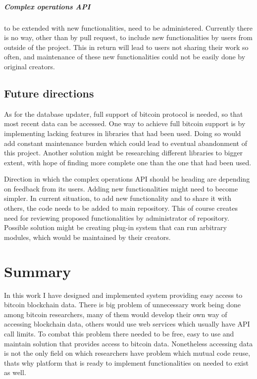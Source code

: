 \documentclass[12pt, en, eng, oneside]{mgr}
\begin{document}
\paragraph{Complex operations API} to be extended with new functionalities, need to be administered. Currently there is no way, other than by pull request, to include new functionalities by users from outside of the project. This in return will lead to users not sharing their work so often, and maintenance of these new functionalities could not be easily done by original creators.

\section{Future directions}
As for the database updater, full support of bitcoin protocol is needed, so that most recent data can be accessed. One way to achieve full bitcoin support is by implementing lacking features in libraries that had been used. Doing so would add constant maintenance burden which could lead to eventual abandonment of this project. Another solution might be researching different libraries to bigger extent, with hope of finding more complete one than the one that had been used.

Direction in which the complex operations API should be heading are depending on feedback from its users. Adding new functionalities might need to become simpler. In current situation, to add new functionality and to share it with others, the code needs to be added to main repository. This of course creates need for reviewing proposed functionalities by administrator of repository. Possible solution might be creating plug-in system that can run arbitrary modules, which would be maintained by their creators. 

\chapter{Summary}
In this work I have designed and implemented system providing easy access to bitcoin blockchain data. There is big problem of unnecessary work being done among bitcoin researchers, many of them would develop their own way of accessing blockchain data, others would use web services which usually have API call limits. To combat this problem there needed to be free, easy to use and maintain solution that provides access to bitcoin data. 
Nonetheless accessing data is not the only field on which researchers have problem which mutual code reuse, thats why platform that is ready to implement functionalities on needed to exist as well. 
\end{document}
